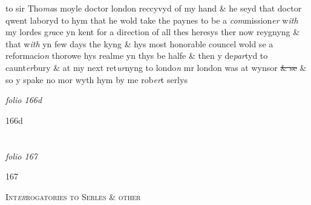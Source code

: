 \documentclass[12pt, a4paper]{book}
\begin{document}
				\marginpar[\vspace{0.5cm}{\textcolor{Gray}{moyle}}]{}
			
		\ifthenelse{\isodd{\thepage}}
		{\reversemarginpar}
		{\normalmarginpar}
		to sir Tho\textit{ma}s moyle doctor london reccyvyd of my hand \& he seyd that doctor qwent laboryd to hym
			 that he wold take the paynes to be a \textit{com}mission\textit{er} w\textit{ith} my lordes g\textit{ra}ce yn kent for a direction of all thes heresys ther now reygnyng \& that w\textit{ith} yn few days the kyng \& hys most honorable councel wold se a reformacio\textit{n} thorowe hys realme yn thys be halfe \& then y de\textit{par}tyd to caunt\textit{er}bury \& at my next ret\textit{ur}nyng to londo\textit{n} mr london was at wynsor \sout{\& se} \& so y spake no mor wyth hym by me rob\textit{er}t serlys
 	

\dotfill
					

\textit{folio 166d}


 	\begin{flushright}{\color{Gray}166d}\end{flushright}

\dotfill
					  \section*{}  \subsection*{}

\textit{folio 167}



            		\begin{flushright}{\color{Mahogany}167}\end{flushright}
            		
				\begin{center} \begin{large} {\scshape Int\textit{er}rogatories to Serles \& other} \end{large} \end{center}
			
            		
			
\end{document}
